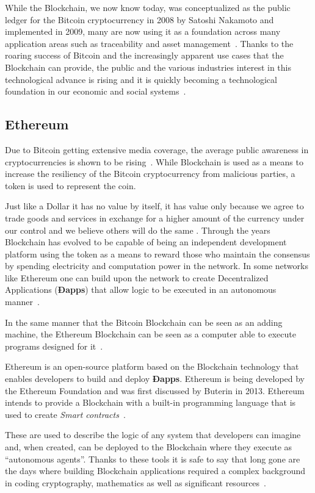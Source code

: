 While the Blockchain, we now know today, was conceptualized as the public
ledger for the Bitcoin cryptocurrency in 2008 by Satoshi Nakamoto and
implemented in 2009, many are now using it as a foundation across many
application areas such as traceability and asset management~\cite{MIT2016}.
Thanks to the roaring success of Bitcoin and the increasingly apparent use
cases that the Blockchain can provide, the public and the various industries
interest in this technological advance is rising and it is quickly becoming a
technological foundation in our economic and social systems~\cite{Zago2018,
Marr2018,Long2018}.

\subsection{Ethereum}

Due to Bitcoin getting extensive media coverage, the average public awareness
in cryptocurrencies is shown to be rising~\cite{BitAwareness2017}. While
Blockchain is used as a means to increase the resiliency of the Bitcoin
cryptocurrency from malicious parties, a token is used to represent the coin. 

Just like a Dollar it has no value by itself, it has value only because we
agree to trade goods and services in exchange for a higher amount of the
currency under our control and we believe others will do the same
\cite{aliessi2016}. Through the years Blockchain has evolved to be capable of
being an independent development platform using the token as a means to
reward those who maintain the consensus by spending electricity and
computation power in the network. In some networks like Ethereum one can
build upon the network to create Decentralized Applications (\textbf{Ðapps})
that allow logic to be executed in an autonomous manner~\cite{Wood2017}. 

In the same manner that the Bitcoin Blockchain can be seen as an adding
machine, the Ethereum Blockchain can be seen as a computer able to execute
programs designed for it~\cite{Wood2015}.

Ethereum is an open-source platform based on the Blockchain technology that
enables developers to build and deploy \textbf{Ðapps}. Ethereum is being
developed by the Ethereum Foundation and was first discussed by Buterin in
2013.  Ethereum intends to provide a Blockchain with a built-in programming
language that is used to create \textit{Smart contracts}~\cite{Wood2017}.

These are used to describe the logic of any system that developers can
imagine and, when created, can be deployed to the Blockchain where they
execute as “autonomous agents”.  Thanks to these tools it is safe to say that
long gone are the days where building Blockchain applications required a
complex background in coding cryptography, mathematics as well as significant
resources~\cite{Wood2017,BlockGeeks2017}.

